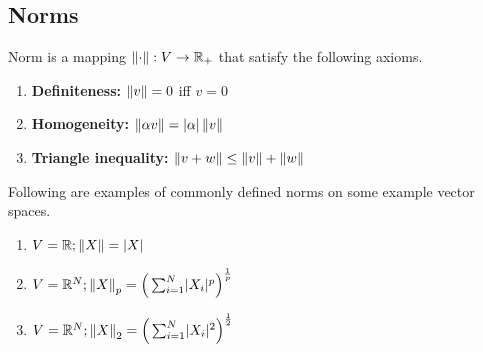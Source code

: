 \documentclass[a4paper,english,12pt]{article}
\begin{document}
\subsection{Norms}
Norm is a mapping $\left\lVert\cdot\right\rVert:V \to \mathbb{R}_+$ that satisfy the following axioms. 
\begin{enumerate}
\item \textbf{Definiteness:} $\left\lVert v\right\rVert = 0$ iff  $v=0$
\item  \textbf{Homogeneity:} $\left\lVert\alpha v\right\rVert = \lvert\alpha\rvert\left\lVert v\right\rVert$
\item  \textbf{Triangle inequality:} $\left\lVert v+w\right\rVert\leq\left\lVert v\right\rVert+\left\lVert w\right\rVert$
\end{enumerate}
\begin{exmp}[Norms] 
Following are examples of commonly defined norms on some example vector spaces. 
\begin{enumerate}
\item $V = \mathbb{R};\left\lVert X\right\rVert = \lvert X\rvert$
\item $V = \mathbb{R}^N;  \left\lVert X\right\rVert_p = \Big(\sum_{i=1}^{N}\lvert X_{i}\rvert^p\Big)^\frac{1}{p}$
\item $V = \mathbb{R}^N; \left\lVert X\right\rVert_2 = \Big(\sum_{i=1}^{N}\lvert X_{i}\rvert^2\Big)^\frac{1}{2}$
\end{enumerate}
\end{exmp}
\end{document}
